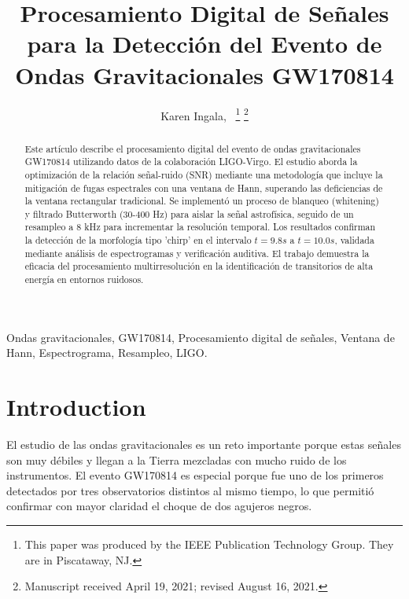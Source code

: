 \documentclass[lettersize,journal]{IEEEtran}
\begin{document}
\title{Procesamiento Digital de Señales para la Detección del Evento de Ondas Gravitacionales GW170814}

\author{Karen Ingala,~
\thanks{This paper was produced by the IEEE Publication Technology Group. They are in Piscataway, NJ.}%
\thanks{Manuscript received April 19, 2021; revised August 16, 2021.}}




\maketitle

\begin{abstract}
Este artículo describe el procesamiento digital del evento de ondas gravitacionales GW170814 utilizando datos de la colaboración LIGO-Virgo. El estudio aborda la optimización de la relación señal-ruido (SNR) mediante una metodología que incluye la mitigación de fugas espectrales con una ventana de Hann, superando las deficiencias de la ventana rectangular tradicional. Se implementó un proceso de blanqueo (whitening) y filtrado Butterworth (30-400 Hz) para aislar la señal astrofísica, seguido de un resampleo a 8 kHz para incrementar la resolución temporal. Los resultados confirman la detección de la morfología tipo 'chirp' en el intervalo $t=9.8s$ a $t=10.0s$, validada mediante análisis de espectrogramas y verificación auditiva. El trabajo demuestra la eficacia del procesamiento multirresolución en la identificación de transitorios de alta energía en entornos ruidosos.
\end{abstract}

\begin{IEEEkeywords}
Ondas gravitacionales, GW170814, Procesamiento digital de señales, Ventana de Hann, Espectrograma, Resampleo, LIGO.
\end{IEEEkeywords}

\section{Introduction}
El estudio de las ondas gravitacionales es un reto importante porque estas señales son muy débiles y llegan a la Tierra mezcladas con mucho ruido de los instrumentos. El evento GW170814 es especial porque fue uno de los primeros detectados por tres observatorios distintos al mismo tiempo, lo que permitió confirmar con mayor claridad el choque de dos agujeros negros\cite{gw170814}.
\end{document}

